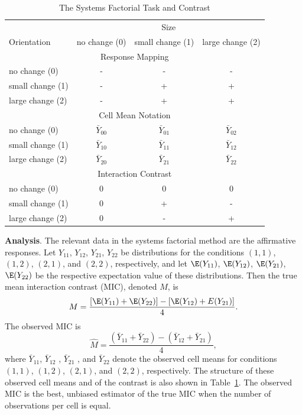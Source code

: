 \documentclass[fignum,nobf,man]{apa}
\begin{document}
\begin{table}
\caption{The Systems Factorial Task and Contrast}
\begin{tabular}{lccc}
& \multicolumn{3}{c}{Size}\\
Orientation &no change (0) & small change (1) & large change (2) \\ \hline
\multicolumn{4}{c}{Response Mapping}\\
no change (0) & - & - & - \\
small change (1) & - & + & + \\
large change (2) & - & + & + \\ \hline
\multicolumn{4}{c}{Cell Mean Notation}\\
no change (0) & $\bar{Y}_{00}$ & $\bar{Y}_{01}$ & $\bar{Y}_{02}$ \\
small change (1) & $\bar{Y}_{10}$ & $\bar{Y}_{11}$ & $\bar{Y}_{12}$ \\
large change (2) & $\bar{Y}_{20}$ & $\bar{Y}_{21}$ & $\bar{Y}_{22}$ \\ \hline
\multicolumn{4}{c}{Interaction Contrast}\\
no change (0) & 0 & 0 &0 \\
small change (1) & 0 & + & - \\
large change (2) & 0 & - & + \\ \hline
\end{tabular}
\label{task}
\end{table}


{\bf Analysis}.  The relevant data in the systems factorial method are the affirmative responses.  Let $Y_{11}$, $Y_{12}$, $Y_{21}$, $Y_{22}$ be distributions for the conditions $(1,1)$, $(1,2)$, $(2,1)$, and $(2,2)$, respectively, and let $\E(Y_{11})$, $\E(Y_{12})$, $\E(Y_{21})$, $\E(Y_{22})$ be the respective expectation value of these distributions.  Then the true mean interaction contrast (MIC), denoted $M$, is
\[
M = \frac{[\E(Y_{11})+\E(Y_{22})]-[\E(Y_{12})+E(Y_{21})]}{4}.
\]
The observed MIC is 
\[
\hat{M} = \frac{(\bar{Y}_{11}+\bar{Y}_{22})-(\bar{Y}_{12}+\bar{Y}_{21})}{4},
\]
where $\bar{Y}_{11}$, $\bar{Y}_{12}$ , $\bar{Y}_{21}$ , and $\bar{Y}_{22}$  denote the observed cell means for conditions $(1,1)$, $(1,2)$, $(2,1)$, and $(2,2)$, respectively.  The structure of these observed cell means and of the contrast is also shown in Table~\ref{task}.    The observed MIC is the best, unbiased estimator of the true MIC when the number of observations per cell is equal.
 
\end{document}
